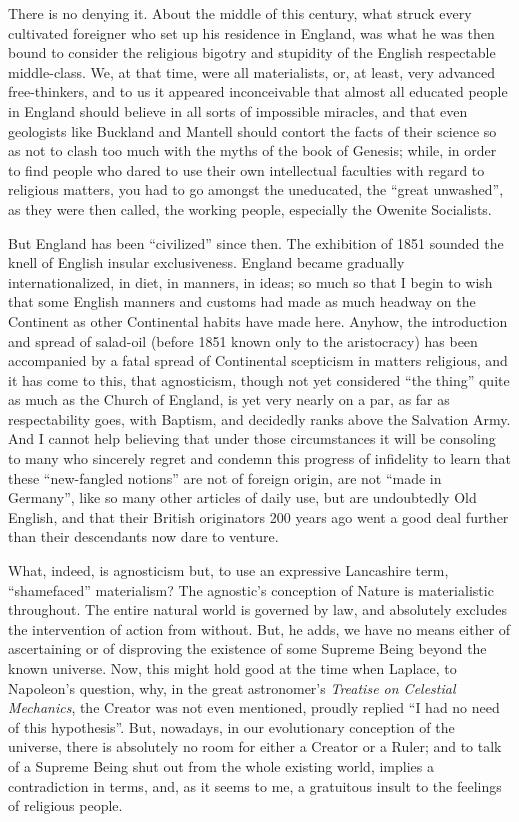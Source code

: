 There is no denying it. About the middle of this century, what struck every
cultivated foreigner who set up his residence in England, was what he was then
bound to consider the religious bigotry and stupidity of the English
respectable middle-class. We, at that time, were all materialists, or, at
least, very advanced free-thinkers, and to us it appeared inconceivable that
almost all educated people in England should believe in all sorts of
impossible miracles, and that even geologists like Buckland and Mantell should
contort the facts of their science so as not to clash too much with the myths
of the book of Genesis; while, in order to find people who dared to use their
own intellectual faculties with regard to religious matters, you had to go
amongst the uneducated, the ``great unwashed'', as they were then called, the
working people, especially the Owenite Socialists.

But England has been ``civilized'' since then. The exhibition of 1851 sounded
the knell of English insular exclusiveness. England became gradually
internationalized, in diet, in manners, in ideas; so much so that I begin to
wish that some English manners and customs had made as much headway on the
Continent as other Continental habits have made here. Anyhow, the introduction
and spread of salad-oil (before 1851 known only to the aristocracy) has been
accompanied by a fatal spread of Continental scepticism in matters religious,
and it has come to this, that agnosticism, though not yet considered ``the
thing'' quite as much as the Church of England, is yet very nearly on a par, as
far as respectability goes, with Baptism, and decidedly ranks above the
Salvation Army. And I cannot help believing that under those circumstances it
will be consoling to many who sincerely regret and condemn this progress of
infidelity to learn that these ``new-fangled notions'' are not of foreign
origin, are not ``made in Germany'', like so many other articles of daily use,
but are undoubtedly Old English, and that their British originators 200 years
ago went a good deal further than their descendants now dare to venture.

What, indeed, is agnosticism but, to use an expressive Lancashire term,
``shamefaced'' materialism? The agnostic's conception of Nature is materialistic
throughout. The entire natural world is governed by law, and absolutely
excludes the intervention of action from without. But, he adds, we have no
means either of ascertaining or of disproving the existence of some Supreme
Being beyond the known universe. Now, this might hold good at the time when
Laplace, to Napoleon's question, why, in the great astronomer's \emph{Treatise
on Celestial Mechanics}, the Creator was not even mentioned, proudly replied ``I
had no need of this hypothesis''. But, nowadays, in our evolutionary conception
of the universe, there is absolutely no room for either a Creator or a Ruler;
and to talk of a Supreme Being shut out from the whole existing world, implies
a contradiction in terms, and, as it seems to me, a gratuitous insult to the
feelings of religious people.

